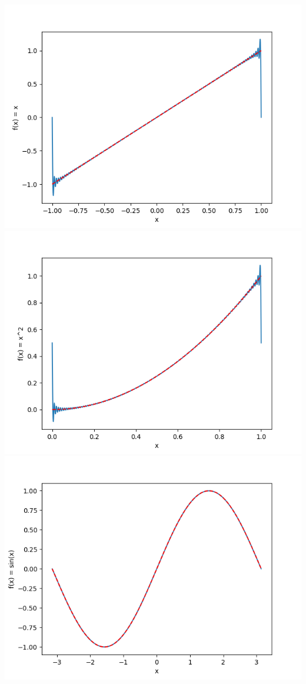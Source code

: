 \includegraphics{Lab1/charts/Figure_1.png}
\includegraphics{Lab1/charts/Figure_2.png}
\includegraphics{Lab1/charts/Figure_3.png}
